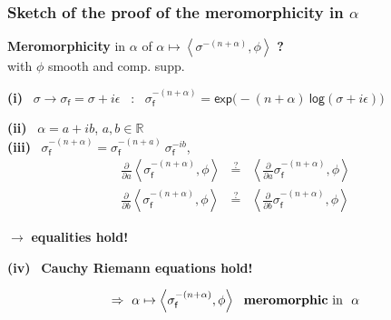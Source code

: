 \documentclass[9pt]{beamer}
\newcommand{\Smearip}[1]{\left\langle #1 \right\rangle} %
\newcommand{\expo}{\mathsf{exp}} %
\newcommand{\logar}{\mathsf{log}} %
\newcommand{\Rbb}{\mathbb{R}}
\newcommand{\fsf}{\mathsf{f}}
\begin{document}
\begin{frame}

\frametitle{Sketch of the proof of the meromorphicity in $\alpha$}

\vfill

\textbf{Meromorphicity} in $\alpha$ of $\alpha \mapsto \Smearip{ \sigma^{-(n+\alpha)} , \phi }$ \textbf{?} \\
with $\phi$ smooth and comp. supp. \\

\vfill

\textbf{(i)} \ $\sigma \to \sigma_\fsf = \sigma + i \epsilon$ \ : \   $\sigma_\fsf^{-(n+\alpha)} = \expo\bigg(-(n+\alpha) \ \logar(\sigma + i \epsilon)\bigg)$ \\

\vfill
 
\textbf{(ii)} \ $\alpha = a + i b$, \quad $a, b \in \Rbb$ \\

\textbf{(iii)} \ $\sigma_\fsf^{-(n+\alpha)} = \sigma_\fsf^{-(n+a)} \ \sigma_\fsf^{-ib}$, 
\begin{eqnarray*}
\frac{\partial}{\partial a} \Smearip{\sigma_\fsf^{-(n+\alpha)},\phi} 
&\overset{?}{=}&
\Smearip{\frac{\partial}{\partial a} \sigma_\fsf^{-(n+\alpha)} , \phi} \\
\frac{\partial}{\partial b} \Smearip{\sigma_\fsf^{-(n+\alpha)},\phi} 
&\overset{?}{=}&
\Smearip{\frac{\partial}{\partial b} \sigma_\fsf^{-(n+\alpha)} , \phi}
\end{eqnarray*}

$\to$ \textbf{equalities hold!} \\[2pt]
 
\vfill

\textbf{(iv)} \ \textbf{Cauchy Riemann equations hold!} \\
 
\vfill

\begin{equation*}
\Rightarrow \ \alpha \mapsto \Smearip{\sigma_\fsf^{-(n+\alpha)},\phi} \ \mbox{ \textbf{meromorphic} in } \ \alpha \hfill 
\end{equation*}

\vfill

\end{frame}

\end{document}
